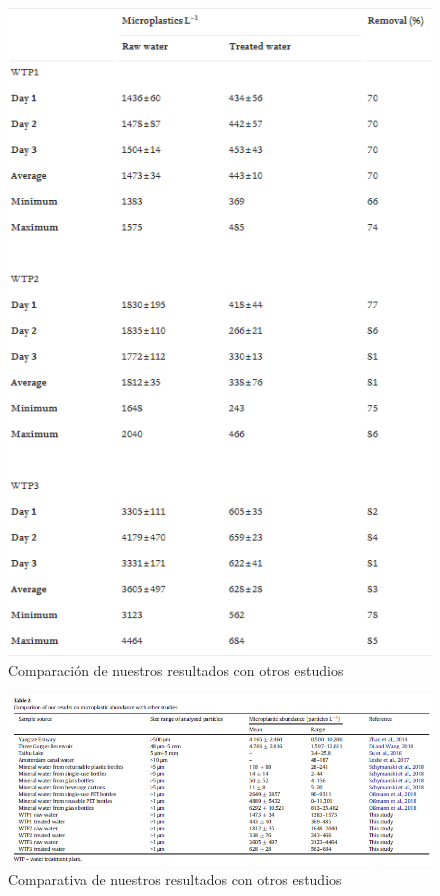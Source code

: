 \documentclass[a4paper,11pt]{article}
\begin{document}
	\begin{figure}[h!]
		\centering
		\includegraphics[scale=0.6]{tabla.png}
		\caption{Comparación de nuestros resultados con otros estudios}
	\end{figure}
	\begin{figure}[h]
		\centering
		\includegraphics[scale=0.5]{tabla2.png}
		\caption{Comparativa de nuestros resultados con otros estudios}
		\label{tabla2}
		
	\end{figure}
\end{document}
